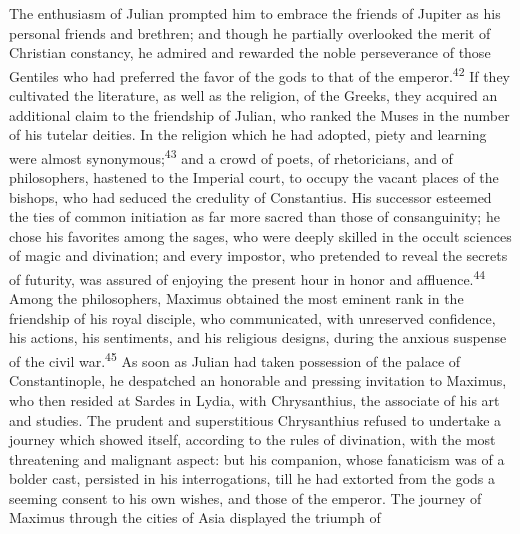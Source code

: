 

The enthusiasm of Julian prompted him to embrace the friends of
Jupiter as his personal friends and brethren; and though he
partially overlooked the merit of Christian constancy, he admired
and rewarded the noble perseverance of those Gentiles who had
preferred the favor of the gods to that of the emperor.\textsuperscript{42} If
they cultivated the literature, as well as the religion, of the
Greeks, they acquired an additional claim to the friendship of
Julian, who ranked the Muses in the number of his tutelar
deities. In the religion which he had adopted, piety and learning
were almost synonymous;\textsuperscript{43} and a crowd of poets, of rhetoricians,
and of philosophers, hastened to the Imperial court, to occupy
the vacant places of the bishops, who had seduced the credulity
of Constantius. His successor esteemed the ties of common
initiation as far more sacred than those of consanguinity; he
chose his favorites among the sages, who were deeply skilled in
the occult sciences of magic and divination; and every impostor,
who pretended to reveal the secrets of futurity, was assured of
enjoying the present hour in honor and affluence.\textsuperscript{44} Among the
philosophers, Maximus obtained the most eminent rank in the
friendship of his royal disciple, who communicated, with
unreserved confidence, his actions, his sentiments, and his
religious designs, during the anxious suspense of the civil war.\textsuperscript{45}
As soon as Julian had taken possession of the palace of
Constantinople, he despatched an honorable and pressing
invitation to Maximus, who then resided at Sardes in Lydia, with
Chrysanthius, the associate of his art and studies. The prudent
and superstitious Chrysanthius refused to undertake a journey
which showed itself, according to the rules of divination, with
the most threatening and malignant aspect: but his companion,
whose fanaticism was of a bolder cast, persisted in his
interrogations, till he had extorted from the gods a seeming
consent to his own wishes, and those of the emperor. The journey
of Maximus through the cities of Asia displayed the triumph of
